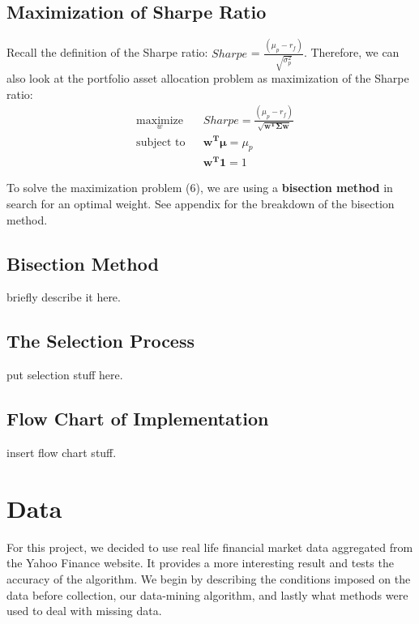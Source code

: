 \documentclass[12pt,titlepage,a4paper]{article}
\begin{document}
\subsection{Maximization of Sharpe Ratio}
Recall the definition of the Sharpe ratio: $Sharpe$ = $\frac{(\mu_p - r_f)}{\sqrt{\sigma_p^2}}$. Therefore, we can also look at the portfolio asset allocation problem as maximization of the Sharpe ratio: 
\begin{equation}
\begin{aligned}
& \underset{w}{\text{maximize}}
& & Sharpe = \frac{(\mu_p - r_f)}{\sqrt{\mathbf{w^T\Sigma w}}} \\
& \text{subject to}
& & \mathbf{w^T\mu} = \mu_p \\
&&& \mathbf{w^T1}=1
\end{aligned}
\end{equation}

To solve the maximization problem (6), we are using a \textbf{bisection method} in search for an optimal weight. See appendix for the breakdown of the bisection method.  

\subsection{Bisection Method}
briefly describe it here.

\subsection{The Selection Process}
put selection stuff here.

\subsection{Flow Chart of Implementation}
insert flow chart stuff. 

\section{Data}
For this project, we decided to use real life financial market data aggregated from the Yahoo Finance website. It provides a more interesting result and tests the accuracy of the algorithm. We begin by describing the conditions imposed on the data before collection, our data-mining algorithm, and lastly what methods were used to deal with missing data.
\end{document}
